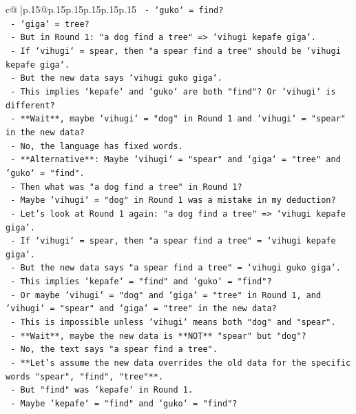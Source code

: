 \documentclass{article}
\begin{document}
{\begin{supertabular}{c@{$\;$}|p{.15\linewidth}@{}p{.15\linewidth}p{.15\linewidth}p{.15\linewidth}p{.15\linewidth}p{.15\linewidth}}
{{{\texttt{    {-} `guko` = find?} \\
\texttt{    {-} `giga` = tree?} \\
\texttt{  {-} But in Round 1: "a dog find a tree" => `vihugi kepafe giga`.} \\
\texttt{  {-} If `vihugi` = spear, then "a spear find a tree" should be `vihugi kepafe giga`.} \\
\texttt{  {-} But the new data says `vihugi guko giga`.} \\
\texttt{  {-} This implies `kepafe` and `guko` are both "find"? Or `vihugi` is different?} \\
\texttt{  {-} **Wait**, maybe `vihugi` = "dog" in Round 1 and `vihugi` = "spear" in the new data?} \\
\texttt{  {-} No, the language has fixed words.} \\
\texttt{  {-} **Alternative**: Maybe `vihugi` = "spear" and `giga` = "tree" and `guko` = "find".} \\
\texttt{  {-} Then what was "a dog find a tree" in Round 1?} \\
\texttt{  {-} Maybe `vihugi` = "dog" in Round 1 was a mistake in my deduction?} \\
\texttt{  {-} Let's look at Round 1 again: "a dog find a tree" => `vihugi kepafe giga`.} \\
\texttt{  {-} If `vihugi` = spear, then "a spear find a tree" = `vihugi kepafe giga`.} \\
\texttt{  {-} But the new data says "a spear find a tree" = `vihugi guko giga`.} \\
\texttt{  {-} This implies `kepafe` = "find" and `guko` = "find"?} \\
\texttt{  {-} Or maybe `vihugi` = "dog" and `giga` = "tree" in Round 1, and `vihugi` = "spear" and `giga` = "tree" in the new data?} \\
\texttt{  {-} This is impossible unless `vihugi` means both "dog" and "spear".} \\
\texttt{  {-} **Wait**, maybe the new data is **NOT** "spear" but "dog"?} \\
\texttt{  {-} No, the text says "a spear find a tree".} \\
\texttt{  {-} **Let's assume the new data overrides the old data for the specific words "spear", "find", "tree"**.} \\
\texttt{  {-} But "find" was `kepafe` in Round 1.} \\
\texttt{  {-} Maybe `kepafe` = "find" and `guko` = "find"?} \\
}}}
\end{supertabular}}
\end{document}

